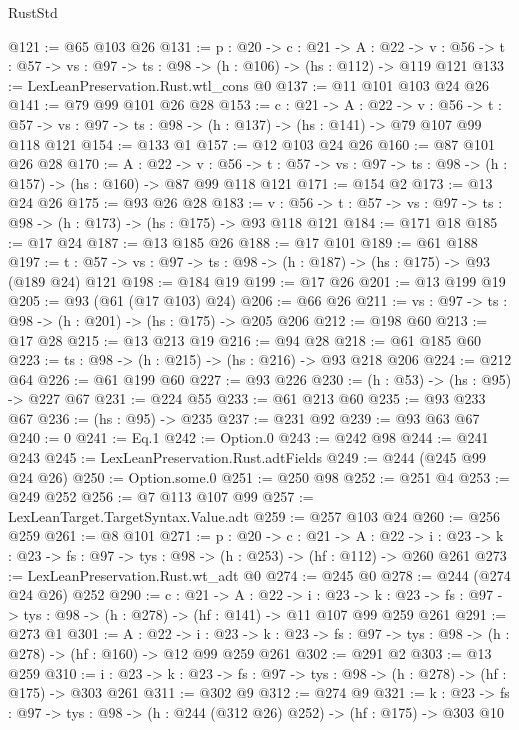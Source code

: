 \begin{lexlean}{RustStd}
\begin{coremodule}
{\begin{coremodule}
{{@121 := @65 @103 @26
@131 := {p : @20} ->
  {c : @21} ->
  {A : @22} ->
  {v : @56} -> {t : @57} -> {vs : @97} -> {ts : @98} -> (h : @106) -> (hs : @112) -> @119 @121
@133 := LexLeanPreservation.Rust.wtl_cons @0
@137 := @11 @101 @103 @24 @26
@141 := @79 @99 @101 @26 @28
@153 := {c : @21} ->
  {A : @22} ->
  {v : @56} ->
  {t : @57} -> {vs : @97} -> {ts : @98} -> (h : @137) -> (hs : @141) -> @79 @107 @99 @118 @121
@154 := @133 @1
@157 := @12 @103 @24 @26
@160 := @87 @101 @26 @28
@170 := {A : @22} ->
  {v : @56} ->
  {t : @57} -> {vs : @97} -> {ts : @98} -> (h : @157) -> (hs : @160) -> @87 @99 @118 @121
@171 := @154 @2
@173 := @13 @24 @26
@175 := @93 @26 @28
@183 := {v : @56} ->
  {t : @57} -> {vs : @97} -> {ts : @98} -> (h : @173) -> (hs : @175) -> @93 @118 @121
@184 := @171 @18
@185 := @17 @24
@187 := @13 @185 @26
@188 := @17 @101
@189 := @61 @188
@197 := {t : @57} -> {vs : @97} -> {ts : @98} -> (h : @187) -> (hs : @175) -> @93 (@189 @24) @121
@198 := @184 @19
@199 := @17 @26
@201 := @13 @199 @19
@205 := @93 (@61 (@17 @103) @24)
@206 := @66 @26
@211 := {vs : @97} -> {ts : @98} -> (h : @201) -> (hs : @175) -> @205 @206
@212 := @198 @60
@213 := @17 @28
@215 := @13 @213 @19
@216 := @94 @28
@218 := @61 @185 @60
@223 := {ts : @98} -> (h : @215) -> (hs : @216) -> @93 @218 @206
@224 := @212 @64
@226 := @61 @199 @60
@227 := @93 @226
@230 := (h : @53) -> (hs : @95) -> @227 @67
@231 := @224 @55
@233 := @61 @213 @60
@235 := @93 @233 @67
@236 := (hs : @95) -> @235
@237 := @231 @92
@239 := @93 @63 @67
@240 := 0
@241 := Eq.{1}
@242 := Option.{0}
@243 := @242 @98
@244 := @241 @243
@245 := LexLeanPreservation.Rust.adtFields
@249 := @244 (@245 @99 @24 @26)
@250 := Option.some.{0}
@251 := @250 @98
@252 := @251 @4
@253 := @249 @252
@256 := @7 @113 @107 @99
@257 := LexLeanTarget.TargetSyntax.Value.adt
@259 := @257 @103 @24
@260 := @256 @259
@261 := @8 @101
@271 := {p : @20} ->
  {c : @21} ->
  {A : @22} ->
  {i : @23} -> {k : @23} -> {fs : @97} -> {tys : @98} -> (h : @253) -> (hf : @112) -> @260 @261
@273 := LexLeanPreservation.Rust.wt_adt @0
@274 := @245 @0
@278 := @244 (@274 @24 @26) @252
@290 := {c : @21} ->
  {A : @22} ->
  {i : @23} ->
  {k : @23} -> {fs : @97} -> {tys : @98} -> (h : @278) -> (hf : @141) -> @11 @107 @99 @259 @261
@291 := @273 @1
@301 := {A : @22} ->
  {i : @23} ->
  {k : @23} -> {fs : @97} -> {tys : @98} -> (h : @278) -> (hf : @160) -> @12 @99 @259 @261
@302 := @291 @2
@303 := @13 @259
@310 := {i : @23} ->
  {k : @23} -> {fs : @97} -> {tys : @98} -> (h : @278) -> (hf : @175) -> @303 @261
@311 := @302 @9
@312 := @274 @9
@321 := {k : @23} ->
  {fs : @97} -> {tys : @98} -> (h : @244 (@312 @26) @252) -> (hf : @175) -> @303 @10
}}
\end{coremodule}}
\end{coremodule}
\end{lexlean}
